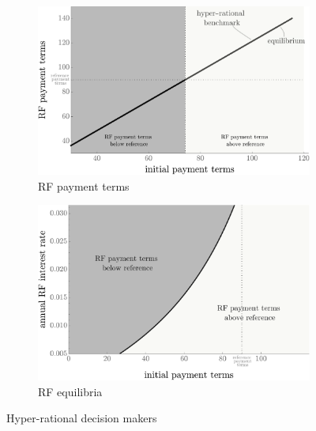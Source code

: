 \documentclass[a4paper,11pt]{article}
\renewcommand{\~}[1]{\tilde{#1}}
\renewcommand{\-}[1]{\overline{#1}}
\begin{document}
%
\begin{figure}[bh]
     \centering
     \begin{subfigure}[b]{0.47\textwidth}
         \centering
         \includegraphics[width=\textwidth]{figures/03_PosteriorTerms_hyperrational_bechmark.pdf}\vspace{7pt}
         \caption{RF payment terms \vspace{12pt}}
         \label{fig:hyper:dr}
     \end{subfigure}
     \hfill
     \begin{subfigure}[b]{0.47\textwidth}
         \centering
         \includegraphics[width=\textwidth]{figures/01_equilibria_hyperrational_benchmark.pdf}
         \caption{RF equilibria\vspace{12pt}}
         \label{fig:hyper:equilibria}
     \end{subfigure}
        \caption{Hyper-rational decision makers}
        \label{fig:hyper}
\end{figure}%
%
\end{document}

